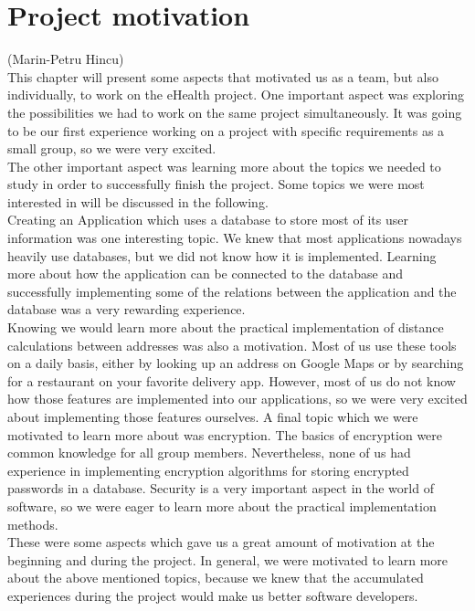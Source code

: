 \documentclass[a4paper, 12pt]{report}
\begin{document}
{\let\clearpage\relax \chapter{Project motivation}}
{\tiny (Marin-Petru Hincu)\\}
This chapter will present some aspects that motivated us as a team, but also individually, to work on the eHealth project.
One important aspect was exploring the possibilities we had to work on the same project simultaneously. It was going to be our first experience working on a project with specific requirements as a small group, so we were very excited. \\
The other important aspect was learning more about the topics we needed to study in order to successfully finish the project. Some topics we were most interested in will be discussed in the following.\\
Creating an Application which uses a database to store most of its user information was one interesting topic. We knew that most applications nowadays heavily use databases, but we did not know how it is implemented. Learning more about how the application can be connected to the database and successfully implementing some of the relations between the application and the database was a very rewarding experience. \\
Knowing we would learn more about the practical implementation of distance calculations between addresses was also a motivation. Most of us use these tools on a daily basis, either by looking up an address on Google Maps or by searching for a restaurant on your favorite delivery app. However, most of us do not know how those features are implemented into our applications, so we were very excited about implementing those features ourselves.
A final topic which we were motivated to learn more about was encryption. The basics of encryption were common knowledge for all group members. Nevertheless, none of us had experience in implementing encryption algorithms for storing encrypted passwords in a database. Security is a very important aspect in the world of software, so we were eager to learn more about the practical implementation methods. \\
These were some aspects which gave us a great amount of motivation at the beginning and during the project. In general, we were motivated to learn more about the above mentioned topics, because we knew that the accumulated experiences during the project would make us better software developers.
\\
\\
\\
\end{document}
